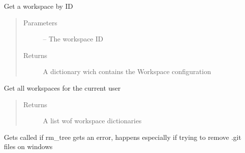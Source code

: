 \documentclass[letterpaper,10pt,english]{sphinxmanual}
\begin{document}
\begin{fulllineitems}
\label{_source/son_editor.impl:son_editor.impl.workspaceimpl.get_workspace}
Get a workspace by ID
\begin{quote}\begin{description}
\item[{Parameters}] \leavevmode
{} -- The workspace ID

\item[{Returns}] \leavevmode
A dictionary wich contains the Workspace configuration

\end{description}\end{quote}

\end{fulllineitems}


\begin{fulllineitems}
\label{_source/son_editor.impl:son_editor.impl.workspaceimpl.get_workspaces}
Get all workspaces for the current user
\begin{quote}\begin{description}
\item[{Returns}] \leavevmode
A list wof workspace dictionaries

\end{description}\end{quote}

\end{fulllineitems}


\begin{fulllineitems}
\label{_source/son_editor.impl:son_editor.impl.workspaceimpl.on_rm_error}
Gets called if rm\_tree gets an error, happens
especially if trying to remove .git files on windows

\end{fulllineitems}
\end{document}
